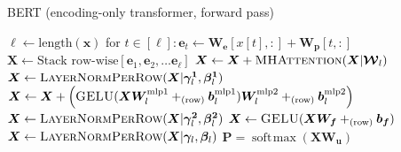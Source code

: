 \documentclass[12pt,aspectratio=169,handout]{beamer}
\DeclareMathOperator*{\softmax}{soft\!\max}
\begin{document}
\begin{frame}{BERT (encoding-only transformer, forward pass)}

\vspace{-2em}
\begin{minipage}[t][10cm][t]{15cm}
\begin{algorithmic}[1]
\State $\ell \gets \text{length}(\bm{x})$
\State for $t \in [\ell]: \bm{e}_t \gets \bm{W_e}[x[t],:] + \bm{W_p}[t,:]$
\State $\bm{X} \gets \text{Stack row-wise}[\bm{e}_1, \bm{e}_2, \ldots \bm{e}_{\ell}]$
\State $\bm{X} \gets \bm{X} + \textsc{MHAttention}(\bm{X} | \bm{\mathcal{W}}_l)$
\State $\bm{X} \gets \textsc{LayerNormPerRow}(\bm{X} | \bm{\gamma^1}_l, \bm{\beta^1}_l)$
\State $\bm{X} \gets \bm{X} + \left(
\textsc{GELU}(\bm{X} \bm{W}^\text{mlp1}_l +_{\text{(row)}} \bm{b}^\text{mlp1}_l )
\bm{W}^{\text{mlp2}}_l +_{\text{(row)}} \bm{b}^{\text{mlp2}}_l \right)$
\State $\bm{X} \gets \textsc{LayerNormPerRow}(\bm{X} | \bm{\gamma^2}_l, \bm{\beta^2}_l)$
\EndFor
\State $\bm{X} \gets \textsc{GELU}(\bm{X} \bm{W_f}  +_{\text{(row)}} \bm{b_f} )$
\State $\bm{X} \gets \textsc{LayerNormPerRow}(\bm{X} | \bm{\gamma}_l, \bm{\beta}_l)$
\State \Return $\bm{P} = \softmax(\bm{X} \bm{W_u}) $
\EndFunction
\end{algorithmic}

\end{minipage}
\end{frame}
\end{document}
